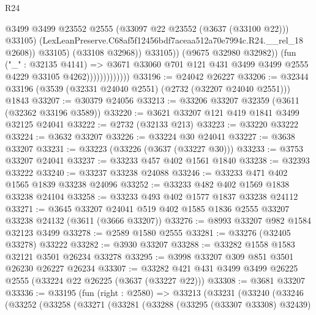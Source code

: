 \begin{lexlean}{R24}
\begin{coremodule}
                                          @3499
                                          @3499
                                          @23552
                                          @2555
                                          (@33097 @22 @23552 (@3637 (@33100 @22)))
                                          @33105)
                                        (LexLeanPreserve.C68af5f12456bdf7aceaa512a70e7994c.R24.__rel_18
                                          @2608))
                                      @33105)
                                    (@33108 @32968))
                                  @33105))
                              (@9675 @32980 @32982))
                            (fun ("_" : @32135 @4141) =>
                            @3671
                              @33060
                              @701
                              @121
                              @431
                              @3499
                              @3499
                              @2555
                              @4229
                              @33105
                              @4262)))))))))))))
@33196 := @24042 @26227
@33206 := @32344 @33196 (@3539 (@32331 @24040 @2551) (@2732 (@32207 @24040 @2551))) @1843
@33207 := @30379 @24056
@33213 := @33206 @33207 @32359 (@3611 (@32362 @33196 @3589))
@33220 := @3621 @33207 @121 @419 @1841 @3499 @32125 @24041
@33222 := @2732 (@32133 @213)
@33223 := @33220 @33222
@33224 := @3632 @33207
@33226 := @33224 @30 @24041
@33227 := @3638 @33207
@33231 := @33223 (@33226 (@3637 (@33227 @30)))
@33233 := @3753 @33207 @24041
@33237 := @33233 @457 @402 @1561 @1840
@33238 := @32393 @33222
@33240 := @33237 @33238 @24088
@33246 := @33233 @471 @402 @1565 @1839 @33238 @24096
@33252 := @33233 @482 @402 @1569 @1838 @33238 @24104
@33258 := @33233 @493 @402 @1577 @1837 @33238 @24112
@33271 := @3645
    @33207
    @24041
    @519
    @402
    @1585
    @1836
    @2555
    @33207
    @33238
    @24132
    (@3611 (@3666 @33207))
@33276 := @8993 @33207 @982 @1584 @32123 @3499
@33278 := @2589 @1580 @2555
@33281 := @33276 (@32405 @33278) @33222
@33282 := @3930 @33207
@33288 := @33282 @1558 @1583 @32121 @3501 @26234 @33278
@33295 := @3998 @33207 @309 @851 @3501 @26230 @26227 @26234
@33307 := @33282 @421 @431 @3499 @3499 @26225 @2555 (@33224 @22 @26225 (@3637 (@33227 @22)))
@33308 := @3681 @33207
@33336 := @33195
    (fun (right : @2580) =>
    @33213
      (@33231
        (@33240
          (@33246
            (@33252
              (@33258
                (@33271
                  (@33281
                    (@33288
                      (@33295 (@33307 @33308) @32439)

\end{coremodule}
\end{lexlean}
